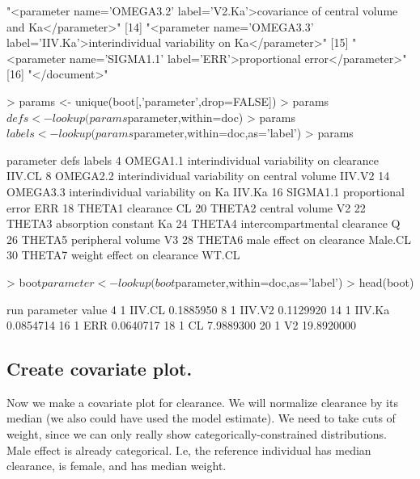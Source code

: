 \begin{Schunk}
\begin{Soutput}
[13] "<parameter name='OMEGA3.2' label='V2.Ka'>covariance of central volume and Ka</parameter>"           
[14] "<parameter name='OMEGA3.3' label='IIV.Ka'>interindividual variability on Ka</parameter>"            
[15] "<parameter name='SIGMA1.1' label='ERR'>proportional error</parameter>"                              
[16] "</document>"                                                                                        
\end{Soutput}
\begin{Sinput}
> params <- unique(boot[,'parameter',drop=FALSE])
> params$defs <- lookup(params$parameter,within=doc)
> params$labels <- lookup(params$parameter,within=doc,as='label')
> params
\end{Sinput}
\begin{Soutput}
   parameter                                          defs  labels
4   OMEGA1.1      interindividual variability on clearance  IIV.CL
8   OMEGA2.2 interindividual variability on central volume  IIV.V2
14  OMEGA3.3             interindividual variability on Ka  IIV.Ka
16  SIGMA1.1                            proportional error     ERR
18    THETA1                                     clearance      CL
20    THETA2                                central volume      V2
22    THETA3                           absorption constant      Ka
24    THETA4                  intercompartmental clearance       Q
26    THETA5                             peripheral volume      V3
28    THETA6                      male effect on clearance Male.CL
30    THETA7                    weight effect on clearance   WT.CL
\end{Soutput}
\begin{Sinput}
> boot$parameter <- lookup(boot$parameter,within=doc,as='label')
> head(boot)
\end{Sinput}
\begin{Soutput}
   run parameter      value
4    1    IIV.CL  0.1885950
8    1    IIV.V2  0.1129920
14   1    IIV.Ka  0.0854714
16   1       ERR  0.0640717
18   1        CL  7.9889300
20   1        V2 19.8920000
\end{Soutput}
\end{Schunk}
\subsection{Create covariate plot.}
Now we make a covariate plot for clearance.  We will normalize clearance 
by its median (we also could have used the model estimate).  We need to take 
cuts of weight, since we can only really show categorically-constrained distributions.
Male effect is already categorical.  I.e, the reference individual has median
clearance, is female, and has median weight.
